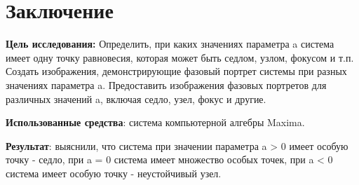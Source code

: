 \documentclass[c]{beamer}
\begin{document}
\section{Заключение}
\textbf{Цель исследования:} Определить, при каких значениях параметра a система имеет одну точку равновесия, которая может быть седлом, узлом, фокусом и т.п. Создать изображения, демонстрирующие фазовый портрет системы при разных значениях параметра a. Предоставить изображения фазовых портретов для различных значений a, включая седло, узел, фокус и другие. 

\textbf{Использованные средства}: система компьютерной
алгебры Maxima.

\textbf{Результат}: выяснили, что система при значении
параметра a > 0 имеет особую точку - седло, при a = 0
система имеет множество особых точек, при a < 0 система
имеет особую точку - неустойчивый узел.
\end{document}
